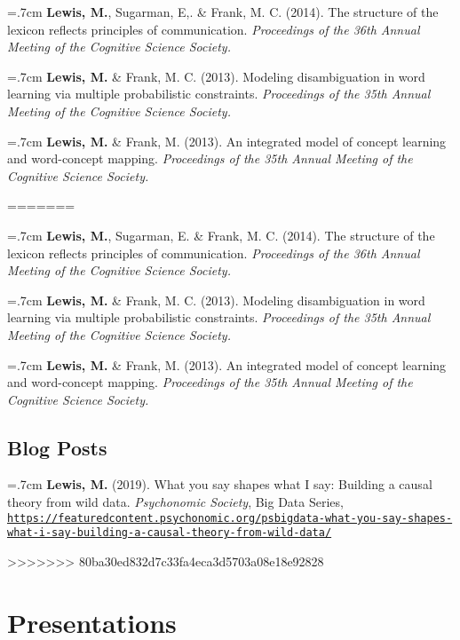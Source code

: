 \documentclass[letterpaper]{article}
\begin{document}
 \hangindent=.7cm {\bf Lewis, M.}, Sugarman, E,. \& Frank, M. C. (2014). The structure of the lexicon reflects principles of communication. { \it Proceedings of the 36th Annual Meeting of the Cognitive Science Society.}
  
 \hangindent=.7cm {\bf Lewis, M.} \& Frank, M. C. (2013). Modeling disambiguation in word learning via multiple probabilistic constraints. { \it Proceedings of the 35th Annual Meeting of the Cognitive Science Society.}

 \hangindent=.7cm {\bf Lewis, M.} \& Frank, M. (2013). An integrated model of concept learning and word-concept mapping.{ \it Proceedings of the 35th Annual Meeting of the Cognitive Science Society.}
 
=======

 \hangindent=.7cm {\bf Lewis, M.}, Sugarman, E. \& Frank, M. C. (2014). The structure of the lexicon reflects principles of communication. { \it Proceedings of the 36th Annual Meeting of the Cognitive Science Society.}

 \hangindent=.7cm {\bf Lewis, M.} \& Frank, M. C. (2013). Modeling disambiguation in word learning via multiple probabilistic constraints. { \it Proceedings of the 35th Annual Meeting of the Cognitive Science Society.}

 \hangindent=.7cm {\bf Lewis, M.} \& Frank, M. (2013). An integrated model of concept learning and word-concept mapping.{ \it Proceedings of the 35th Annual Meeting of the Cognitive Science Society.}

  \subsection*{Blog Posts}
    \hangindent=.7cm {\bf Lewis, M.} (2019). What you say shapes what I say: Building a causal theory from wild data.  { \it Psychonomic Society}, Big Data Series, \href{https://featuredcontent.psychonomic.org/psbigdata-what-you-say-shapes-what-i-say-building-a-causal-theory-from-wild-data/}{\tt https://featuredcontent.psychonomic.org/psbigdata-what-you-say-{\newline}shapes-what-i-say-building-a-causal-theory-from-wild-data/}


>>>>>>> 80ba30ed832d7c33fa4eca3d5703a08e18e92828
 \singlespacing

\section*{Presentations}
\onehalfspacing
\end{document}
